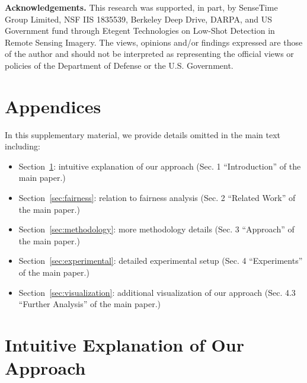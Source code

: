 \documentclass[10pt,twocolumn,letterpaper]{article}
\begin{document}
\vspace{2pt}
\noindent
\textbf{Acknowledgements.}
{\small
This research was supported, in part, by SenseTime Group Limited, NSF IIS 1835539, Berkeley Deep Drive, DARPA, and US Government fund through Etegent Technologies on Low-Shot Detection in Remote Sensing Imagery.  The views, opinions and/or findings expressed are those of the author and should not be interpreted as representing the official views or policies of the Department of Defense or the U.S. Government.
} 

{\small


}

\clearpage

\appendix
{}
\section*{Appendices}



In this supplementary material, we provide details omitted in the main text including:
\begin{itemize}[leftmargin=*]
\vspace{-6pt}
\item Section~\ref{sec:explanation}: intuitive explanation of our approach (Sec. 1 ``Introduction'' of the main paper.)
\vspace{-6pt}
\item Section~\ref{sec:fairness}: relation to fairness analysis (Sec. 2 ``Related Work'' of the main paper.)
\vspace{-6pt}
\item Section~\ref{sec:methodology}: more methodology details (Sec. 3 ``Approach'' of the main paper.)
\vspace{-6pt}
\item Section~\ref{sec:experimental}: detailed experimental setup (Sec. 4 ``Experiments'' of the main paper.)
\vspace{-6pt}
\item Section~\ref{sec:visualization}: additional visualization of our approach (Sec. 4.3 ``Further Analysis'' of the main paper.)
\end{itemize}



\section{Intuitive Explanation of Our Approach}
\label{sec:explanation}
\end{document}
